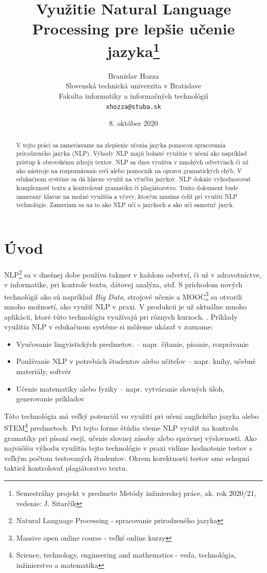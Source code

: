 \documentclass[10pt,slovak,a4paper,twoside]{article}
\title{Využitie Natural Language Processing pre lepšie učenie jazyka\thanks{Semestrálny projekt v predmete Metódy inžinierskej práce, ak. rok 2020/21, vedenie: J. Sitarčík}}
\author{Branislav Hozza\\[2pt]
	{\small Slovenská technická univerzita v Bratislave}\\
	{\small Fakulta informatiky a informačných technológií}\\
	{\small \texttt{xhozza@stuba.sk}}
	}
\date{\small 8. október 2020}
\begin{document}
\maketitle
\begin{abstract}
	V tejto práci sa zameriavame na zlepšenie učenia jazyka pomocou spracovania prirodzeného jazyka (NLP).
	Výhody NLP majú bohaté využitie v učení ako napríklad prístup k obrovskému zdroju textov. 
	NLP sa dnes využíva v mnohých odvetviach či už ako nástroje na rozpoznávanie reči alebo pomocník na opravu gramatických chýb. 
	V edukačnom systéme sa dá hlavne využiť na výučbu jazykov. NLP dokáže vyhodnocovať komplexnosť textu a kontrolovať gramatiku či plagiátorstvo. 
	Tento dokument bude zameraný hlavne na možné využitia a výzvy, ktorým musíme čeliť pri využití NLP technológie. 
	Zameriam sa na to ako NLP učí o jazykoch a ako učí samotný jazyk.
\end{abstract}
\section{Úvod}\label{uvod}
NLP\footnote{Natural Language Processing - spracovanie prirodzeného jazyka} sa v dnešnej dobe používa takmer v každom odvetví, či už v zdravotníctve, 
v informatike, pri kontrole textu, dátovej analýza, atď. S príchodom nových technológií ako sú napríklad \textit{Big Data}, strojové učenie a 
MOOC\footnote{Massive open online course - veľké online kurzy} sa otvorili mnoho možností, ako využiť NLP v praxi. 
V produkcii je už aktuálne mnoho aplikácii, ktoré túto technológiu využívajú pri rôznych kurzoch. \cite{litman2016natural}. 
Príklady využitia NLP v edukačnom systéme si môžeme ukázať v zozname:
\begin{itemize}
	\item Vyučovanie lingvistických predmetov.
	– napr. čítanie, písanie, rozprávanie
	\item Používanie NLP v potrebách študentov alebo učiteľov
	– napr. knihy, učebné materiály, softvér
	\item Učenie matematiky alebo fyziky
	– napr. vytváranie slovných úloh, generovanie príkladov
\end{itemize}

Táto technológia má veľký potenciál vo využití pri učení anglického jazyka 
alebo STEM\footnote{Science, technology, engineering and mathematics - veda, technológia, inžinierstvo a matematika} predmetoch. 
Pri tejto forme štúdia vieme NLP využiť na kontrolu gramatiky pri písaní esejí, učenie slovnej zásoby alebo správnej výslovnosti.
Ako najväčšiu výhodu využitia tejto technológie v praxi vidíme hodnotenie testov s veľkým počtom testovaných študentov. 
Okrem korektnosti testov sme schopní taktiež kontrolovať plagiátorstvo textu.
\end{document}
